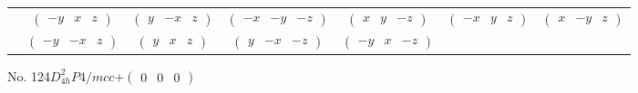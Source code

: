 \documentclass[fleqn,9pt,landscape]{jsarticle}
\begin{document}
\begin{center}
\begin{longtable}{ccccccc}
& $ \begin{pmatrix} - y & x & z \end{pmatrix} $ & $ \begin{pmatrix} y & - x & z \end{pmatrix} $ & $ \begin{pmatrix} - x & - y & - z \end{pmatrix} $ & $ \begin{pmatrix} x & y & - z \end{pmatrix} $ & $ \begin{pmatrix} - x & y & z \end{pmatrix} $ & $ \begin{pmatrix} x & - y & z \end{pmatrix} $ \\
& $ \begin{pmatrix} - y & - x & z \end{pmatrix} $ & $ \begin{pmatrix} y & x & z \end{pmatrix} $ & $ \begin{pmatrix} y & - x & - z \end{pmatrix} $ & $ \begin{pmatrix} - y & x & - z \end{pmatrix} $ & $  $ & $  $ \\
\end{longtable}
\end{center}
\newpage
No. 124\quad$D_{4h}^{2}$\quad$P4/mcc$\quad[ tetragonal ]\quad$+\begin{pmatrix} 0 & 0 & 0 \end{pmatrix}$
\end{document}
